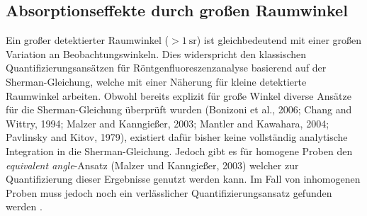 \subsection{Absorptionseffekte durch großen Raumwinkel}
Ein großer detektierter Raumwinkel ($>\SI{1}{\steradian}$) ist gleichbedeutend mit einer großen Variation an Beobachtungswinkeln. Dies widerspricht den klassischen Quantifizierungsansätzen für Röntgenfluoreszenzanalyse basierend auf der Sherman-Gleichung, welche mit einer Näherung für kleine detektierte Raumwinkel arbeiten.\newline
Obwohl bereits explizit für große Winkel diverse Ansätze für die Sherman-Gleichung überprüft wurden (Bonizoni et al., 2006; Chang and Wittry, 1994; Malzer and Kanngießer, 2003; Mantler and Kawahara, 2004; Pavlinsky and Kitov, 1979), existiert dafür bisher keine vollständig analytische Integration in die Sherman-Gleichung. Jedoch gibt es für homogene Proben den \textit{equivalent angle}-Ansatz (Malzer und Kanngießer, 2003) welcher zur Quantifizierung dieser Ergebnisse genutzt werden kann. Im Fall von inhomogenen Proben muss jedoch noch ein verlässlicher Quantifizierungsansatz gefunden werden \cite[Abs.~1.2.2]{lars}.